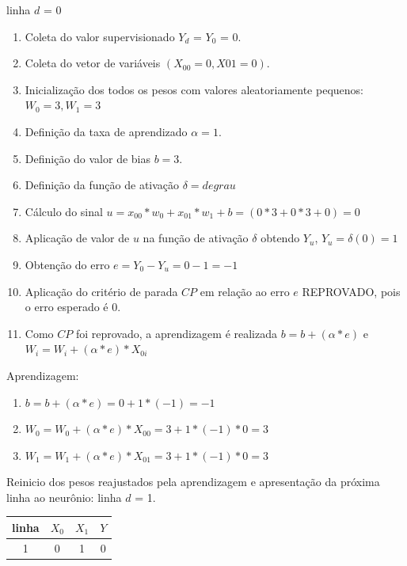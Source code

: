 \documentclass[	12pt, Times, openright, twoside, a4paper, english, brazil]{abntex2}
\begin{document}
  			 	 linha $d$ = 0
	  			 \begin{enumerate}
	  			    
	  			 	\item Coleta do valor supervisionado $Y_d$ = $Y_0$ = 0.
	  			 	\item Coleta do vetor de variáveis $(X_{00} = 0, X{01}=0)$.
	  			 	\item Inicialização dos todos os pesos com valores aleatoriamente pequenos: $W_0=3,W_1=3$
	  			 	\item Definição da taxa de aprendizado $\alpha = 1$.
	  			 	\item Definição do valor de bias $b=3$.
	  			 	\item Definição da função de ativação $\delta = degrau$  
	  			 	\item Cálculo do sinal $u = x_{00}*w_0 + x_{01}*w_1 +b = (0*3+0*3+0) = 0$
	  			 	\item Aplicação de valor de $u$ na função de ativação $\delta$ obtendo $Y_u$, $Y_u = \delta(0) = 1$
	  			 	\item Obtenção do erro $e = Y_0-Y_u = 0 - 1 = -1$
	  			 	\item Aplicação do critério de parada $CP$ em relação ao erro $e$ REPROVADO, pois o erro esperado é 0.
	  			 	\item Como $CP$ foi reprovado, a aprendizagem é realizada $b=b+(\alpha*e)$ e $W_i=W_i + (\alpha*e)*X_{0i}$
	  			 \end{enumerate}		
  				
    				Aprendizagem:
    				\begin{enumerate}
    					\item $b=b+(\alpha*e) = 0 + 1*(-1) = -1 $  					
    					\item $W_0=W_0 + (\alpha*e)*X_{00} = 3 + 1*(-1)*0 = 3$
    					\item $W_1=W_1 + (\alpha*e)*X_{01} = 3 + 1*(-1)*0 = 3$
    				\end{enumerate}	
    				
    				Reinicio dos pesos reajustados pela aprendizagem e apresentação da próxima linha ao neurônio:
    				linha $d$ = 1.\\
    				\begin{table}[!ht]
                    \centering
    				\begin{tabular}{|c|c|c|c|}
    					\hline  \textbf{linha} & \textbf{$X_0$} & \textbf{$X_1$} &  \textbf{$Y$}\\
  				 	    \hline 1 & 0 & 1 & 0\\ \hline
    				\end{tabular}
    				\end{table}
    				
\end{document}
